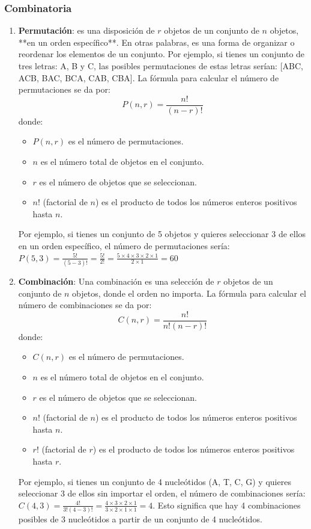 \begin{enumerate}
\end{enumerate}

\subsubsection{Combinatoria}
\begin{enumerate}
\item \textbf{Permutación}: es una disposición de $r$ objetos de un conjunto de $n$ objetos, **en un orden específico**. En otras palabras, es una forma de organizar o reordenar los elementos de un conjunto. Por ejemplo, si tienes un conjunto de tres letras: A, B y C, las posibles permutaciones de estas letras serían: [ABC, ACB, BAC, BCA, CAB, CBA].
La fórmula para calcular el número de permutaciones se da por: 
$$P(n, r) = \frac{n!}{(n-r)!}$$ 
donde:
\begin{itemize}
\item $P(n, r)$ es el número de permutaciones.
\item $n$ es el número total de objetos en el conjunto.
\item $r$ es el número de objetos que se seleccionan.
\item $n!$ (factorial de $n$) es el producto de todos los números enteros positivos hasta $n$.
\end{itemize}

Por ejemplo, si tienes un conjunto de 5 objetos y quieres seleccionar 3 de ellos en un orden específico, el número de permutaciones sería: $P(5, 3) = \frac{5!}{(5-3)!} = \frac{5!}{2!} = \frac{5 \times 4 \times 3 \times 2 \times 1}{2 \times 1} = 60$

\item \textbf{Combinación}: Una combinación es una selección de $r$ objetos de un conjunto de $n$ objetos, donde el orden no importa. La fórmula para calcular el número de combinaciones se da por:
$$C(n, r) = \frac{n!}{n!(n-r)!}$$
donde:
\begin{itemize}
\item $C(n, r)$ es el número de permutaciones.
\item $n$ es el número total de objetos en el conjunto.
\item $r$ es el número de objetos que se seleccionan.
\item $n!$ (factorial de $n$) es el producto de todos los números enteros positivos hasta $n$.
\item $r!$ (factorial de $r$) es el producto de todos los números enteros positivos hasta $r$.
\end{itemize}

Por ejemplo, si tienes un conjunto de 4 nucleótidos (A, T, C, G) y quieres seleccionar 3 de ellos sin importar el orden, el número de combinaciones sería: $C(4, 3) = \frac{4!}{3!(4-3)!} = \frac{4 \times 3 \times 2 \times 1}{3 \times 2 \times 1 \times 1} = 4$. Esto significa que hay 4 combinaciones posibles de 3 nucleótidos a partir de un conjunto de 4 nucleótidos.

\end{enumerate}

